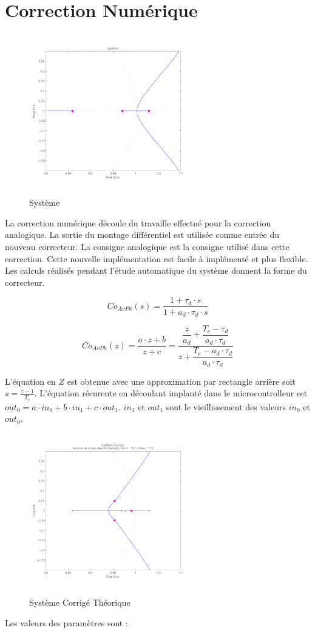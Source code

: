 \documentclass[11pt, french]{article} %
\begin{document}
\section{Correction Numérique}
\begin{figure}
		
	\includegraphics[width = 7cm,trim=0 1.4cm 0 1.2cm ,clip=true]
					{SolutionNumerique/Systeme.pdf}
	\caption{Système}
\end{figure}
La correction numérique découle du travaille effectué pour la correction analogique. La sortie du montage différentiel est utilisée comme entrée du nouveau correcteur. La consigne analogique est la consigne utilisé dans cette correction.
Cette nouvelle implémentation est facile à implémenté et plus flexible. Les calculs réalisés pendant l'étude automatique du système donnent la forme du correcteur.

\[Co_{AvPh}(s)=\dfrac{1+ \tau_d \cdot s}{1 + a_d \cdot \tau_d \cdot s} \]

\[Co_{AvPh}(z)=\dfrac{a \cdot z + b}{z + c}=\dfrac{\dfrac{z}{a_d}+\dfrac{T_e-\tau_d}{a_d \cdot \tau_d} }{z+\dfrac{T_e-a_d \cdot \tau_d}{a_d \cdot \tau_d}}\] 

L'équation en $Z$ est obtenue avec une approximation par rectangle arrière soit $s=\frac{z-1}{T_e}$. L'équation récurente en découlant implanté dans le microcontrolleur est $out_0=a \cdot in_0 + b \cdot in_1 + c \cdot out_1$. $in_1$ et $out_1$ sont le vieillissement des valeurs $in_0$ et $out_0$.

\begin{figure}

	\includegraphics[width = 7cm,trim=0 1.4cm 0 0.7cm ,clip=true]
					{SolutionNumerique/SystemeCorrigeThorique.pdf}
	\caption{Système Corrigé Théorique}
	\vspace{1cm}
\end{figure}
Les valeurs des paramètres sont :
\end{document}
